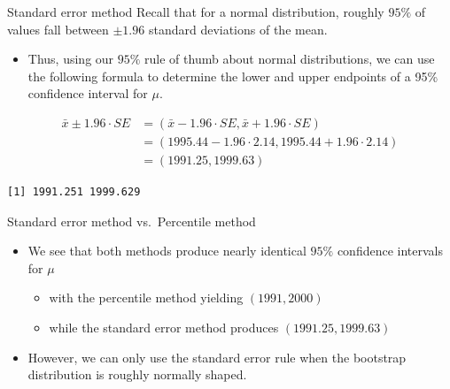 \documentclass[
  ignorenonframetext,
]{beamer}
\newenvironment{Shaded}{\begin{snugshade}}{\end{snugshade}}
\newcommand{\DecValTok}[1]{\textcolor[rgb]{0.00,0.00,0.81}{#1}}
\newcommand{\FunctionTok}[1]{\textcolor[rgb]{0.13,0.29,0.53}{\textbf{#1}}}
\newcommand{\NormalTok}[1]{#1}
\newcommand{\SpecialCharTok}[1]{\textcolor[rgb]{0.81,0.36,0.00}{\textbf{#1}}}
\providecommand{\tightlist}{%
  \setlength{\itemsep}{0pt}\setlength{\parskip}{0pt}}
\begin{document}
\begin{frame}[fragile]{Standard error method}
\protect\hypertarget{standard-error-method-2}{}
Recall that for a normal distribution, roughly \(95\%\) of values fall
between \(\pm1.96\) standard deviations of the mean.

\begin{itemize}
\tightlist
\item
  Thus, using our \(95\%\) rule of thumb about normal distributions, we
  can use the following formula to determine the lower and upper
  endpoints of a 95\% confidence interval for \(\mu\).
\end{itemize}

\[\begin{array}{ll}
\bar{x}\pm1.96\cdot SE&=(\bar{x}-1.96\cdot SE, \bar{x}+1.96\cdot SE)\\
&=(1995.44-1.96\cdot 2.14, 1995.44+1.96\cdot2.14)\\
&=(1991.25,1999.63)
\end{array}\]

\begin{Shaded}
\end{Shaded}

\begin{verbatim}
[1] 1991.251 1999.629
\end{verbatim}
\end{frame}

\begin{frame}{Standard error method vs.~Percentile method}
\protect\hypertarget{standard-error-method-vs.-percentile-method}{}
\begin{itemize}
\item
  We see that both methods produce nearly identical \(95\%\) confidence
  intervals for \(\mu\)

  \begin{itemize}
  \tightlist
  \item
    with the percentile method yielding \((1991, 2000)\)
  \item
    while the standard error method produces \((1991.25, 1999.63)\)
  \end{itemize}
\item
  However, we can only use the standard error rule when the bootstrap
  distribution is roughly normally shaped.
\end{itemize}
\end{frame}
\end{document}
